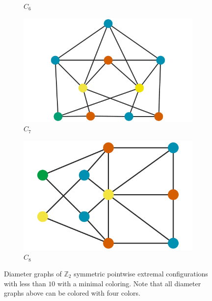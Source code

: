 \documentclass[12pt]{amsart}
\theoremstyle{plain}
\numberwithin{equation}{section}
\begin{document}
\begin{figure}[H]
\begin{subfigure}[b]{0.22\textwidth}
		\caption{$C_6$}
	\end{subfigure}
	\hfill
	\begin{subfigure}[b]{0.22\textwidth}
		\centering
		\includegraphics[width =\columnwidth]{./figures/C7_dg.pdf}
		\caption{$C_7$}
	\end{subfigure}
	\hfill
	\begin{subfigure}[b]{0.22\textwidth}
		\centering
		\includegraphics[width =\columnwidth]{./figures/C8_dg.pdf}
		\caption{$C_8$}
	\end{subfigure}
	\caption{Diameter graphs of $\mathbb{Z}_2$ symmetric pointwise extremal configurations with less than $10$ with a minimal coloring. Note that all diameter graphs above can be colored with four colors.}
	\label{figure:C_diam_graph}
\end{figure}
\end{document}
